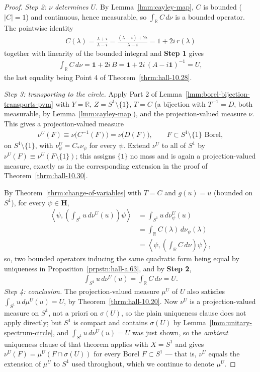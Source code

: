 \begin{proof}
\textit{Step 2: $\nu$ determines $U$.} By Lemma~\ref{lmm:cayley-map}, $C$ is bounded ($\lvert C \rvert = 1$) and continuous, hence measurable, so $\int_{\mathbb{R}} C \, d\nu$ is a bounded operator. The pointwise identity
\begin{align}
    C(\lambda) = \frac{\lambda+i}{\lambda-i} = \frac{(\lambda - i) + 2i}{\lambda-i} = 1 + 2i\,r(\lambda)
\end{align}
together with linearity of the bounded integral and \textbf{Step 1} gives
\begin{align}
    \int_{\mathbb{R}} C \, d\nu = \mathbf{1} + 2i\,B = \mathbf{1} + 2i\,(A-i\mathbf{1})^{-1} = U,
\end{align}
the last equality being Point 4 of Theorem~\ref{thrm:hall-10.28}.

\textit{Step 3: transporting to the circle.} Apply Part 2 of Lemma~\ref{lmm:borel-bijection-transports-pvm} with $Y = \mathbb{R}$, $Z = S^1\setminus\{1\}$, $T = C$ (a bijection with $T^{-1} = D$, both measurable, by Lemma~\ref{lmm:cayley-map}), and the projection-valued measure $\nu$. This gives a projection-valued measure
\begin{align}
    \nu^U(F) \equiv \nu\big( C^{-1}(F) \big) = \nu\big( D(F) \big), \qquad F \subset S^1\setminus\{1\} \text{ Borel},
\end{align}
on $S^1\setminus\{1\}$, with $\nu^U_\psi = C_*\nu_\psi$ for every $\psi$. Extend $\nu^U$ to all of $S^1$ by $\nu^U(F) \equiv \nu^U(F\setminus\{1\})$; this assigns $\{1\}$ no mass and is again a projection-valued measure, exactly as in the corresponding extension in the proof of Theorem~\ref{thrm:hall-10.30}.

By Theorem~\ref{thrm:change-of-variables} with $T = C$ and $g(u) = u$ (bounded on $S^1$), for every $\psi \in \mathbf{H}$,
\begin{align}
    \left< \psi, \left( \int_{S^1} u \, d\nu^U(u) \right)\psi \right> &= \int_{S^1} u \, d\nu^U_\psi(u) \\
                &= \int_{\mathbb{R}} C(\lambda)\,d\nu_\psi(\lambda) \\
                &= \left< \psi, \left( \int_{\mathbb{R}} C \, d\nu \right)\psi \right>,
\end{align}
so, two bounded operators inducing the same quadratic form being equal by uniqueness in Proposition~\ref{prpstn:hall-a.63}, and by \textbf{Step 2},
\begin{align}
    \int_{S^1} u \, d\nu^U(u) = \int_{\mathbb{R}} C \, d\nu = U.
\end{align}
\textit{Step 4: conclusion.} The projection-valued measure $\mu^U$ of $U$ also satisfies $\int_{S^1} u \, d\mu^U(u) = U$, by Theorem~\ref{thrm:hall-10.20}. Now $\nu^U$ is a projection-valued measure on $S^1$, not a priori on $\sigma(U)$, so the plain uniqueness clause does not apply directly; but $S^1$ is compact and contains $\sigma(U)$ by Lemma~\ref{lmm:unitary-spectrum-circle}, and $\int_{S^1} u \, d\nu^U(u) = U$ was just shown, so the \textit{ambient} uniqueness clause of that theorem applies with $X = S^1$ and gives $\nu^U(F) = \mu^U(F \cap \sigma(U))$ for every Borel $F \subset S^1$ — that is, $\nu^U$ equals the extension of $\mu^U$ to $S^1$ used throughout, which we continue to denote $\mu^U$.


\end{proof}
